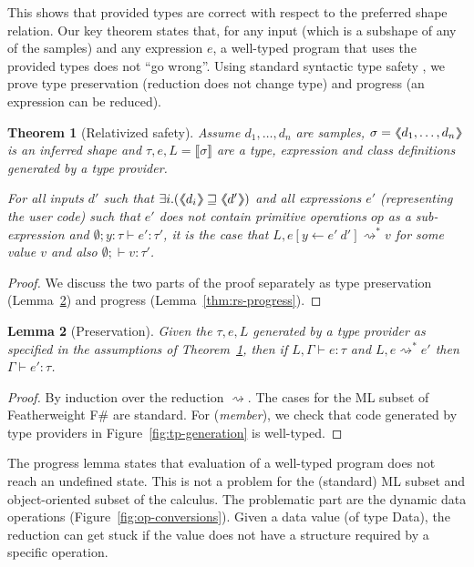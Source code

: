 \documentclass[10pt,preprint,blind,clearpagebib]{sigplanconf}
\newcommand{\langl}{\begin{picture}(4.5,7)
\put(1.1,2.5){\rotatebox{60}{\line(1,0){5.5}}}
\put(1.1,2.5){\rotatebox{300}{\line(1,0){5.5}}}
\end{picture}}
\newcommand{\rangl}{\begin{picture}(4.5,7)
\put(.9,2.5){\rotatebox{120}{\line(1,0){5.5}}}
\put(.9,2.5){\rotatebox{240}{\line(1,0){5.5}}}
\end{picture}}
\newcommand{\llangl}{\langl\hspace{-0.35em}\langl}
\newcommand{\rrangl}{\rangl\hspace{-0.35em}\rangl}
\newcommand{\ident}[1]{\textnormal{\sffamily #1}}
\newcommand{\reduce}{\rightsquigarrow}
\newcommand{\sem}[1]{\llbracket #1 \rrbracket}
\newcommand{\semalt}[1]{\llangl #1 \rrangl}
\newtheorem{theorem}{Theorem}
\newtheorem{lemma}[theorem]{Lemma}
\begin{document}
\noindent
This shows that provided types are correct with respect to the preferred shape relation. 
Our key theorem states that, for any input (which is a subshape of any of the samples) and 
any expression $e$, a well-typed program that uses the provided types does not ``go wrong''.
Using standard syntactic type safety  \cite{syntactic}, we prove type preservation 
(reduction does not change type) and progress (an expression can be reduced).

\begin{theorem}[Relativized safety]
\label{thm:safety}
Assume $d_1, \ldots, d_n$ are samples, $\sigma=\semalt{d_1, \ldots, d_n}$ is an inferred
shape and $\tau,e,L = \sem{\sigma}$ are a type, expression and class definitions generated by a 
type provider.

For all inputs $d'$ such that $\exists i.(\semalt{d_i} \sqsupseteq \semalt{d'})$ and all expressions $e'$
(representing the user code) such that $e'$ does not contain primitive operations $op$ as a sub-expression and
$\emptyset; y\!:\!\tau \vdash e'\!:\!\tau'$, it is the case that $L, e[y\leftarrow e'~d'] \reduce^{*} v$ for some value $v$ and
also $\emptyset; \vdash v : \tau'$.
\end{theorem}
\begin{proof}
We discuss the two parts of the proof separately as type preservation (Lemma~\ref{thm:rs-preservation})
and progress (Lemma~\ref{thm:rs-progress}).
\end{proof}

\begin{lemma}[Preservation]
\label{thm:rs-preservation}
Given the $\tau, e, L$ generated by a type provider as specified in
the assumptions of Theorem~\ref{thm:safety}, then if $L, \Gamma \vdash e : \tau$ and 
$L, e \reduce^{*} e'$ then $\Gamma \vdash e' : \tau$.
\end{lemma}
\begin{proof}
By induction over the reduction $\reduce$. The cases for the ML subset of Featherweight F\# 
are standard. For (\emph{member}), we check that code generated by type providers
in Figure~\ref{fig:tp-generation} is well-typed.
\end{proof}

\noindent
The progress lemma states that evaluation of a well-typed program does not reach an undefined state. 
This is not a problem for the (standard) ML subset and object-oriented subset of the calculus. The 
problematic part are the dynamic data operations (Figure~\ref{fig:op-conversions}). Given a data
value (of type \ident{Data}), the reduction can get stuck if the value does not have a structure 
required by a specific operation.
\end{document}
